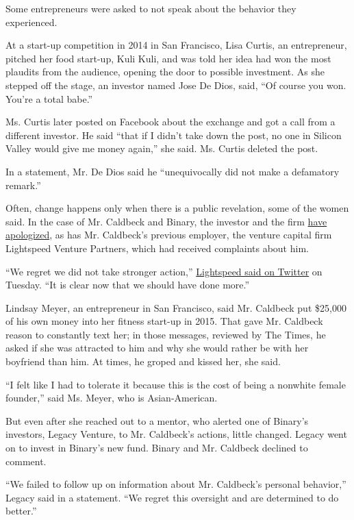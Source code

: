 Some entrepreneurs were asked to not speak about the behavior they
experienced.

At a start-up competition in 2014 in San Francisco, Lisa Curtis, an
entrepreneur, pitched her food start-up, Kuli Kuli, and was told her
idea had won the most plaudits from the audience, opening the door to
possible investment. As she stepped off the stage, an investor named
Jose De Dios, said, ``Of course you won. You're a total babe.''

Ms. Curtis later posted on Facebook about the exchange and got a call
from a different investor. He said ``that if I didn't take down the
post, no one in Silicon Valley would give me money again,'' she said.
Ms. Curtis deleted the post.

In a statement, Mr. De Dios said he ``unequivocally did not make a
defamatory remark.''

Often, change happens only when there is a public revelation, some of
the women said. In the case of Mr. Caldbeck and Binary, the investor and
the firm
\href{https://twitter.com/caldbeckj/status/878343782231531520}{have
apologized}, as has Mr. Caldbeck's previous employer, the venture
capital firm Lightspeed Venture Partners, which had received complaints
about him.

``We regret we did not take stronger action,''
\href{https://twitter.com/lightspeedvp/status/879731401242705920}{Lightspeed
said on Twitter} on Tuesday. ``It is clear now that we should have done
more.''

Lindsay Meyer, an entrepreneur in San Francisco, said Mr. Caldbeck put
\$25,000 of his own money into her fitness start-up in 2015. That gave
Mr. Caldbeck reason to constantly text her; in those messages, reviewed
by The Times, he asked if she was attracted to him and why she would
rather be with her boyfriend than him. At times, he groped and kissed
her, she said.

``I felt like I had to tolerate it because this is the cost of being a
nonwhite female founder,'' said Ms. Meyer, who is Asian-American.

But even after she reached out to a mentor, who alerted one of Binary's
investors, Legacy Venture, to Mr. Caldbeck's actions, little changed.
Legacy went on to invest in Binary's new fund. Binary and Mr. Caldbeck
declined to comment.

``We failed to follow up on information about Mr. Caldbeck's personal
behavior,'' Legacy said in a statement. ``We regret this oversight and
are determined to do better.''

